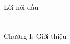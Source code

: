 \documentclass[a4paper, 12pt, twoside]{article}
\begin{document}

\renewcommand{\contentsname}
{\centering\vnmsans\Large\textcolor{vol}{Mục lục}}
{
  \hypersetup{linkcolor=black}
  \tableofcontents
}
\newpage
\section*{\label{preface}} 
{\centering\vnmsans\Large\textcolor{vol}{Lời nói đầu}\par}



\newpage
\section*{\label{epNLP.1}} 
{\centering\vnmsans\Huge\textcolor{vol}{Chương I: Giới thiệu}\par}


% 

% 

\newpage
% 
\end{document}
